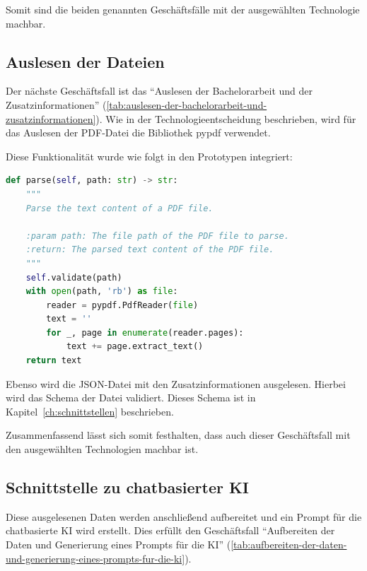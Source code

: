 Somit sind die beiden genannten Geschäftsfälle mit der ausgewählten Technologie machbar.

\subsection{Auslesen der Dateien}\label{subsec:auslesen-der-dateien}
Der nächste Geschäftsfall ist das ``Auslesen der Bachelorarbeit und der Zusatzinformationen'' (\ref{tab:auslesen-der-bachelorarbeit-und-zusatzinformationen}).
Wie in der Technologieentscheidung beschrieben, wird für das Auslesen der PDF-Datei die Bibliothek pypdf verwendet.

Diese Funktionalität wurde wie folgt in den Prototypen integriert:
\begin{lstlisting}[caption={Auslesen von PDF-Dateien},captionpos=b,label={lst:pypdf}, language=Python, breaklines=true]
def parse(self, path: str) -> str:
    """
    Parse the text content of a PDF file.

    :param path: The file path of the PDF file to parse.
    :return: The parsed text content of the PDF file.
    """
    self.validate(path)
    with open(path, 'rb') as file:
        reader = pypdf.PdfReader(file)
        text = ''
        for _, page in enumerate(reader.pages):
            text += page.extract_text()
    return text
\end{lstlisting}

Ebenso wird die JSON-Datei mit den Zusatzinformationen ausgelesen.
Hierbei wird das Schema der Datei validiert.
Dieses Schema ist in Kapitel~\ref{ch:schnittstellen} beschrieben.

Zusammenfassend lässt sich somit festhalten, dass auch dieser Geschäftsfall mit den ausgewählten Technologien machbar ist.

\subsection{Schnittstelle zu chatbasierter KI}\label{subsec:schnittstelle-zu-chatbasierter-ki}
Diese ausgelesenen Daten werden anschließend aufbereitet und ein Prompt für die chatbasierte KI wird erstellt.
Dies erfüllt den Geschäftsfall ``Aufbereiten der Daten und Generierung eines Prompts für die KI'' (\ref{tab:aufbereiten-der-daten-und-generierung-eines-prompts-fur-die-ki}).

